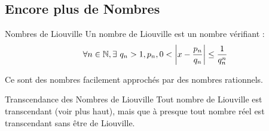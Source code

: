 \documentclass{cours}
\begin{document}
    \subsection{Encore plus de Nombres}
    \begin{définition}{Nombres de Liouville}{}
        Un nombre de Liouville est un nombre vérifiant : 
    \[
        \forall n \in \mathbb{N}, \exists\ q_{n} > 1, p_{n}, 0 < \left|x - \frac{p_{n}}{q_{n}}\right| \leq \frac{1}{q_{n}^{n}}
    \]
    \end{définition}

    \begin{remarque}{}{}
        Ce sont des nombres facilement approchés par des nombres rationnels.
    \end{remarque}

    \begin{théorème}{Transcendance des Nombres de Liouville}{}
        Tout nombre de Liouville est transcendant (voir plus haut), mais que à presque tout nombre réel est transcendant sans être de Liouville.
    \end{théorème}
    
\end{document}
